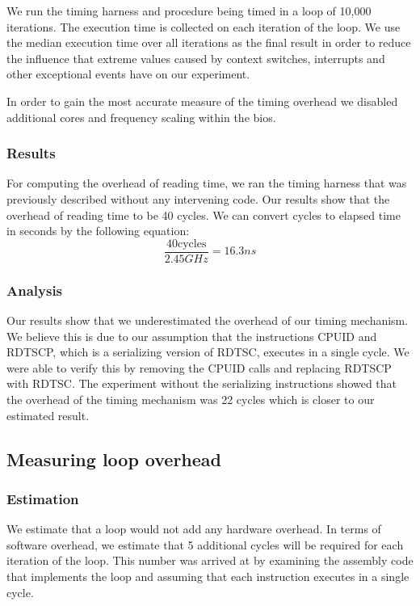 We run the timing harness and procedure being timed in a loop of 10,000
iterations. The execution time is collected on each iteration of the loop. We
use the median execution time over all iterations as the final result in order
to reduce the influence that extreme values caused by context switches,
interrupts and other exceptional events have on our experiment. 

In order to gain the most accurate measure of the timing overhead we disabled
additional cores and frequency scaling within the bios.

\subsubsection{Results} 

For computing the overhead of reading time, we ran the timing harness that was
previously described without any intervening code.  Our results show that the
overhead of reading time to be 40 cycles. We can convert cycles to elapsed time 
in seconds by the following equation:
$$\frac{40\text{cycles}}{2.45GHz} = 16.3ns$$

\subsubsection{Analysis}

Our results show that we underestimated the overhead of our timing mechanism. We
believe this is due to our assumption that the instructions CPUID and RDTSCP,
which is a serializing version of RDTSC, executes in a single cycle. We were
able to verify this by removing the CPUID calls and replacing RDTSCP with RDTSC.
The experiment without the serializing instructions showed that the overhead of
the timing mechanism was 22 cycles which is closer to our estimated result.

\subsection{Measuring loop overhead}

\subsubsection{Estimation}

We estimate that a loop would not add any hardware
overhead. In terms of software overhead, we estimate that 5 additional cycles
will be required for each iteration of the loop. This number was arrived at by
examining the assembly code that implements the loop and assuming that each
instruction executes in a single cycle.

